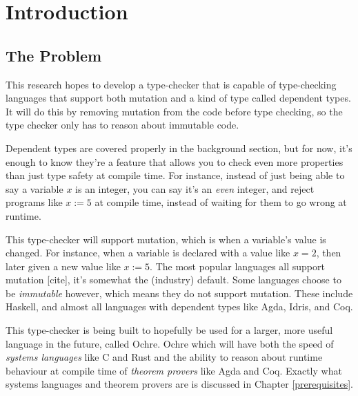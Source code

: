 \documentclass[12pt,twoside]{report}
\begin{document}
\clearpage{\pagestyle{empty}\cleardoublepage}

\tableofcontents 


\setcounter{page}{1}
\fancyhead[LE,RO]{\slshape \rightmark}
\fancyhead[LO,RE]{\slshape \leftmark}

\chapter{Introduction}
\section{The Problem}
This research hopes to develop a type-checker that is capable of type-checking languages that support both mutation and a kind of type called dependent types. It will do this by removing mutation from the code before type checking, so the type checker only has to reason about immutable code.

Dependent types are covered properly in the background section, but for now, it's enough to know they're a feature that allows you to check even more properties than just type safety at compile time. For instance, instead of just being able to say a variable $x$ is an integer, you can say it's an \textit{even} integer, and reject programs like $x := 5$ at compile time, instead of waiting for them to go wrong at runtime.

This type-checker will support mutation, which is when a variable's value is changed. For instance, when a variable is declared with a value like $x = 2$, then later given a new value like $x := 5$. The most popular languages all support mutation [cite], it's somewhat the (industry) default. Some languages choose to be \textit{immutable} however, which means they do not support mutation. These include Haskell, and almost all languages with dependent types like Agda, Idris, and Coq.

This type-checker is being built to hopefully be used for a larger, more useful language in the future, called Ochre. Ochre which will have both the speed of \textit{systems languages} like C and Rust and the ability to reason about runtime behaviour at compile time of \textit{theorem provers} like Agda and Coq. Exactly what systems languages and theorem provers are is discussed in Chapter \ref{prerequisites}.
\end{document}

